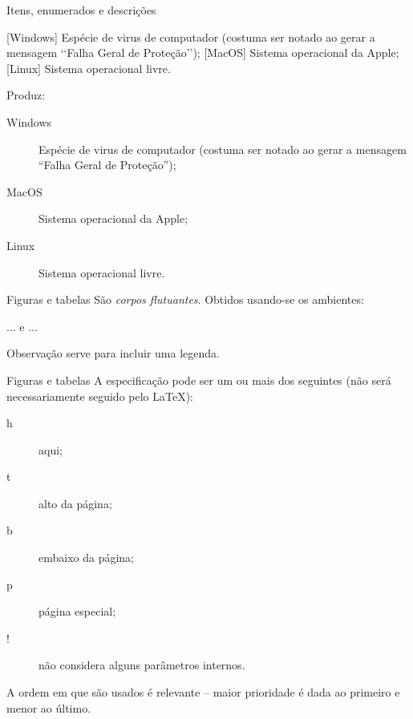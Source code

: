 \begin{frame}{Itens, enumerados e descrições}
\begin{LaTeXcode}
 \n
{} [Windows] Espécie de virus de computador
(costuma ser notado ao gerar a mensagem
`{}`Falha Geral de Proteção'{}'); \n
{} [MacOS] Sistema operacional da Apple; \n
{} [Linux] Sistema operacional livre. \n
{}
\end{LaTeXcode}

Produz:

\begin{LaTeXoutput}
\begin{description}
\item [Windows] Espécie de virus de computador
(costuma ser notado ao gerar a mensagem
``Falha Geral de Proteção'');
\item [MacOS] Sistema operacional da Apple;
\item [Linux] Sistema operacional livre.
\end{description}
\end{LaTeXoutput}
\end{frame}

\begin{frame}{Figuras e tabelas}
São \emph{corpos flutuantes}. Obtidos usando-se os ambientes:
\begin{LaTeXcode}
\Lopt[especificação] \n
... \n
{} \n
{} \n
e \n
{}\Lopt[especificação] \n
... \n
{} \n
{}
\end{LaTeXcode}

\begin{block}{Observação}
 serve para incluir uma legenda.
\end{block}
\end{frame}

\begin{frame}{Figuras e tabelas}
A especificação pode ser um ou mais dos seguintes (não será necessariamente seguido pelo \LaTeX):
\begin{description}
\item [h] aqui;
\item [t] alto da página;
\item [b] embaixo da página;
\item [p] página especial;
\item [!] não considera alguns parâmetros internos.
\end{description}

\begin{block}{}
A ordem em que são usados é relevante -- maior prioridade é dada ao primeiro e menor ao último.
\end{block}
\end{frame}


